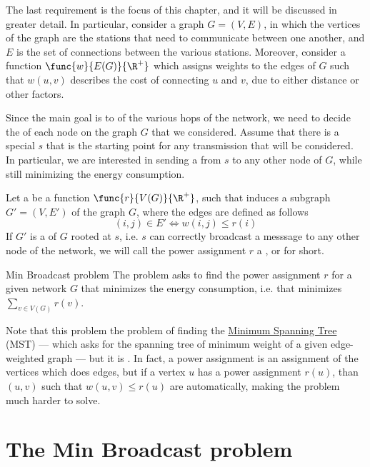 \documentclass[a4paper, 12pt]{report}
\begin{document}
    The last requirement is the focus of this chapter, and it will be discussed in greater detail. In particular, consider a graph $G = (V, E)$, in which the vertices of the graph are the stations that need to communicate between one another, and $E$ is the set of connections between the various stations. Moreover, consider a function $\func{w}{E(G)}{\R^+}$ which assigns weights to the edges of $G$ such that $w(u, v)$ describes the cost of connecting $u$ and $v$, due to either distance or other factors.

    Since the main goal is to  of the various hops of the network, we need to decide the  of each node on the graph $G$ that we considered. Assume that there is a special  $s$ that is the starting point for any transmission that will be considered. In particular, we are interested in sending a  from $s$ to any other node of $G$, while still minimizing the energy consumption.

    Let a  be a function $\func{r}{V(G)}{\R^+}$, such that induces a subgraph $G'= (V, E')$ of the graph $G$, where the edges are defined as follows $$(i, j) \in E' \iff w(i, j) \le r(i)$$ If $G'$ is a  of $G$ rooted at $s$, i.e. $s$ can correctly broadcast a messsage to any other node of the network, we will call the power assignment $r$ a , or  for short.

    \begin{frameddefn}{Min Broadcast problem}
        The  problem asks to find the power assignment $r$ for a given network $G$ that minimizes the energy consumption, i.e. that minimizes $\sum_{v \in V(G)}{r(v)}$.
    \end{frameddefn}

    Note that this problem  the problem of finding the \href{https://en.wikipedia.org/wiki/Minimum_spanning_tree}{Minimum Spanning Tree} (MST) --- which asks for the spanning tree of minimum weight of a given edge-weighted graph --- but it is . In fact, a power assignment is an assignment of the vertices which does  edges, but if a vertex $u$ has a power assignment $r(u)$, than  $(u, v)$ such that $w(u, v) \le r(u)$ are automatically, making the problem much harder to solve.

    \section{The Min Broadcast problem}
\end{document}
